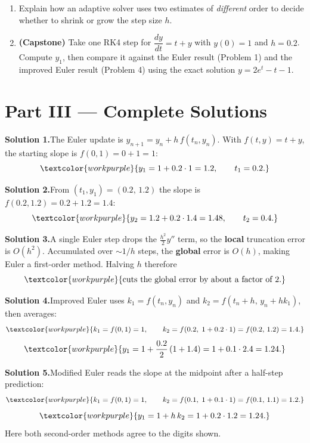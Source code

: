 \begin{enumerate}[leftmargin=2em]
    \item Explain how an adaptive solver uses two estimates of \emph{different}
          order to decide whether to shrink or grow the step size $h$.

    \item \textbf{(Capstone)} Take one RK4 step for $\dfrac{dy}{dt} = t + y$ with
          $y(0) = 1$ and $h = 0.2$. Compute $y_1$, then compare it against the
          Euler result (Problem 1) and the improved Euler result (Problem 4)
          using the exact solution $y = 2e^{t} - t - 1$.
\end{enumerate}

\clearpage
{}
{}
\section*{Part III --- Complete Solutions}

\noindent\textbf{Solution 1.}\quad The Euler update is
$y_{n+1} = y_n + h\,f(t_n,y_n)$. With $f(t,y)=t+y$, the starting slope is
$f(0,1) = 0 + 1 = 1$:
\[ \textcolor{workpurple}{y_1 = 1 + 0.2\cdot 1 = 1.2, \qquad t_1 = 0.2.} \]

\medskip
\noindent\textbf{Solution 2.}\quad From $(t_1,y_1) = (0.2,\,1.2)$ the slope is
$f(0.2,1.2) = 0.2 + 1.2 = 1.4$:
\[ \textcolor{workpurple}{y_2 = 1.2 + 0.2\cdot 1.4 = 1.48, \qquad t_2 = 0.4.} \]

\medskip
\noindent\textbf{Solution 3.}\quad A single Euler step drops the
$\tfrac{h^{2}}{2}y''$ term, so the \textbf{local} truncation error is $O(h^{2})$.
Accumulated over $\sim 1/h$ steps, the \textbf{global} error is $O(h)$, making
Euler a first-order method. Halving $h$ therefore
\[ \textcolor{workpurple}{\text{cuts the global error by about a factor of } 2.} \]

\medskip
\noindent\textbf{Solution 4.}\quad Improved Euler uses
$k_1 = f(t_n,y_n)$ and $k_2 = f(t_n+h,\,y_n+hk_1)$, then averages:
\[ \textcolor{workpurple}{k_1 = f(0,1) = 1, \qquad k_2 = f(0.2,\;1 + 0.2\cdot 1) = f(0.2,\,1.2) = 1.4.} \]
\[ \textcolor{workpurple}{y_1 = 1 + \frac{0.2}{2}\left(1 + 1.4\right) = 1 + 0.1\cdot 2.4 = 1.24.} \]

\medskip
\noindent\textbf{Solution 5.}\quad Modified Euler reads the slope at the
midpoint after a half-step prediction:
\[ \textcolor{workpurple}{k_1 = f(0,1) = 1, \qquad k_2 = f\!\left(0.1,\; 1 + 0.1\cdot 1\right) = f(0.1,\,1.1) = 1.2.} \]
\[ \textcolor{workpurple}{y_1 = 1 + h\,k_2 = 1 + 0.2\cdot 1.2 = 1.24.} \]
Here both second-order methods agree to the digits shown.

